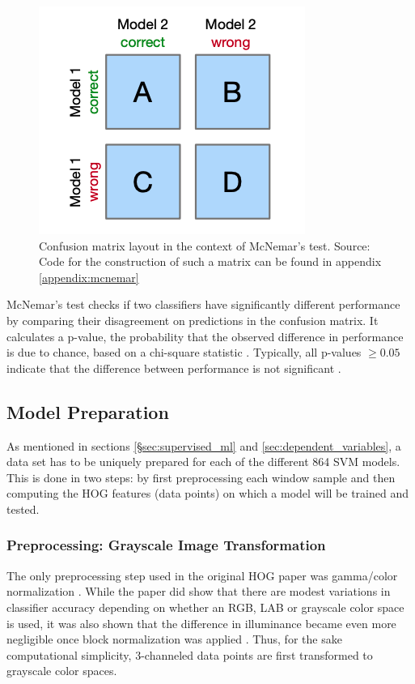 \begin{figure}
    \centering
    \includegraphics[width=0.5\linewidth]{images/mcnemar_matrix.png}
    \caption{Confusion matrix layout in the context of McNemar's test. Source: \cite{raschka_2018_mcnemar} Code for the construction of such a matrix can be found in appendix \ref{appendix:mcnemar}}
    \label{fig:confusion_mcnemar}
\end{figure}

McNemar's test checks if two classifiers have significantly different performance by comparing their disagreement on predictions in the confusion matrix. It calculates a p-value, the probability that the observed difference in performance is due to chance, based on a chi-square statistic \cite{dietterich_1998_mcnemar}. Typically, all p-values $\ge 0.05$ indicate that the difference between performance is not significant \cite{raschka_2018_mcnemar} \cite{dietterich_1998_mcnemar}. 


\subsection{Model Preparation}

As mentioned in sections \ref{§sec:supervised_ml} and \ref{sec:dependent_variables}, a data set has to be uniquely prepared for each of the different 864 SVM models. This is done in two steps: by first preprocessing each window sample and then computing the HOG features (data points) on which a model will be trained and tested.

\subsubsection{Preprocessing: Grayscale Image Transformation}

The only preprocessing step used in the original HOG paper was gamma/color normalization \cite{dalal_2005_histograms}. While the paper did show that there are modest variations in classifier accuracy depending on whether an RGB, LAB or grayscale color space is used, it was also shown that the difference in illuminance became even more negligible once block normalization was applied \cite{dalal_2005_histograms}. Thus, for the sake computational simplicity, 3-channeled data points are first transformed to grayscale color spaces.

